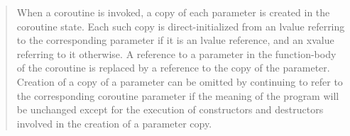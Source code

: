 \begin{quote}
\pnum
When a coroutine is invoked, a copy of each parameter is created in the coroutine state. Each such copy is direct-initialized from an lvalue referring to the corresponding parameter if it is an lvalue reference, and an xvalue referring to it otherwise. 
A reference to a parameter in the function-body of the coroutine is replaced by a reference to the copy of the parameter.
Creation of a copy of a parameter can be omitted by continuing to refer to the corresponding coroutine parameter if the meaning of the program will be unchanged except for the execution of constructors and destructors involved in the creation of a parameter copy.

%
%







\end{quote}

